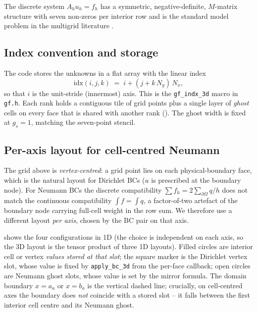 \documentclass[11pt]{article}
\theoremstyle{definition}
\begin{document}
The discrete system $A_h u_h = f_h$ has a symmetric, negative-definite,
$M$-matrix structure with seven non-zeros per interior row and is
the standard model problem in the multigrid literature
\cite[\S2.1]{trottenberg2001multigrid}.

\subsection{Index convention and storage}
The code stores the unknowns in a flat array with the linear index
\begin{equation*}
  \mathrm{idx}(i,j,k) \;=\; i + (j + k\,N_y)\,N_x,
\end{equation*}
so that $i$ is the unit-stride (innermost) axis.  This is the
\texttt{gf\_indx\_3d} macro in \texttt{gf.h}.  Each rank holds a
contiguous tile of grid points plus a single layer of \emph{ghost} cells
on every face that is shared with another rank
().  The ghost width is fixed at $g_s = 1$,
matching the seven-point stencil.

\subsection{Per-axis layout for cell-centred
  Neumann}\label{sec:cell-centred-layout}
The grid above is \emph{vertex-centred}: a grid point lies on each
physical-boundary face, which is the natural layout for Dirichlet BCs
($u$ is prescribed at the boundary node).  For Neumann BCs the
discrete compatibility $\sum f_h = 2\sum_{\partial\Omega} q/h$ does
not match the continuous compatibility $\int f = \int q$, a
factor-of-two artefact of the boundary node carrying full-cell
weight in the row sum.  We therefore use a different layout
\emph{per axis}, chosen by the BC pair on that axis.

 shows the four configurations in 1D
(the choice is independent on each axis, so the 3D layout is the
tensor product of three 1D layouts).  Filled circles are interior
cell or vertex \emph{values stored at that slot}; the square marker
is the Dirichlet vertex slot, whose value is fixed by
\texttt{apply\_bc\_3d} from the per-face callback; open circles are
Neumann ghost slots, whose value is set by the mirror formula.  The
domain boundary $x = a_a$ or $x = b_a$ is the vertical dashed line;
crucially, on cell-centred axes the boundary does \emph{not}
coincide with a stored slot -- it falls between the first interior
cell centre and its Neumann ghost.
\end{document}
